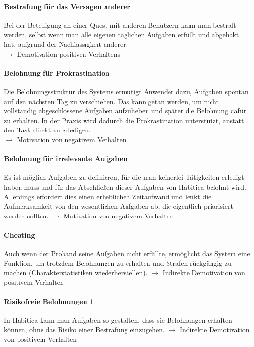 \documentclass[sigconf, nonacm]{acmart}
\begin{document}
\paragraph{Bestrafung für das Versagen  anderer}\label{sec:cpe2}
Bei der Beteiligung an einer Quest mit anderen Benutzern kann man bestraft werden, selbst wenn man alle eigenen täglichen Aufgaben erfüllt und abgehakt hat, aufgrund der Nachlässigkeit anderer.\\
$\rightarrow$ Demotivation positiven Verhaltens

\paragraph{Belohnung für Prokrastination}\label{sec:cpe3}
Die Belohnungsstruktur des Systems ermutigt Anwender dazu, Aufgaben spontan auf den nächsten Tag zu verschieben. Das kann getan werden, um nicht vollständig abgeschlossene Aufgaben aufzuheben und später die Belohnung dafür zu erhalten. In der Praxis wird dadurch die Prokrastination unterstützt, anstatt den Task direkt zu erledigen.\\
$\rightarrow$ Motivation von negativem Verhalten

\paragraph{Belohnung für irrelevante Aufgaben}\label{sec:cpe4}
Es ist möglich Aufgaben zu definieren, für die man keinerlei Tätigkeiten erledigt haben muss und für das Abschließen dieser Aufgaben von Habitica belohnt wird. Allerdings erfordert dies einen erheblichen Zeitaufwand und lenkt die Aufmerksamkeit von den wesentlichen Aufgaben ab, die eigentlich priorisiert werden sollten.
$\rightarrow$ Motivation von negativem Verhalten

\paragraph{Cheating}\label{sec:cpe5}
Auch wenn der Proband seine Aufgaben nicht erfüllte, ermöglicht das System eine Funktion, um trotzdem Belohnungen zu erhalten und Strafen rückgängig zu machen (Charakterstatistiken wiederherstellen).
$\rightarrow$ Indirekte Demotivation von positivem Verhalten

\paragraph{Risikofreie Belohnungen 1}\label{sec:cpe6}
In Habitica kann man Aufgaben so gestalten, dass sie Belohnungen erhalten können, ohne das Risiko einer Bestrafung einzugehen.
$\rightarrow$ Indirekte Demotivation von positivem Verhalten
\end{document}
